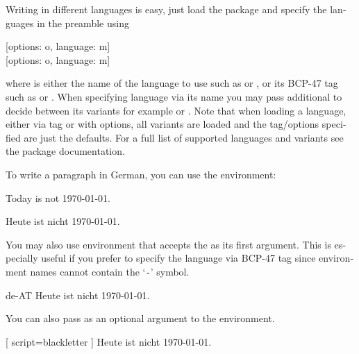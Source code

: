 Writing in different languages is easy, just load the  package
and specify the languages in the preamble using
\begin{lscommand}
  [options: o, language: m] \\
  [options: o, language: m]
\end{lscommand}
where  is either the name of the language to use such as
 or , or its BCP-47 tag such as  or
. When specifying language via its name you may pass
additional  to decide between its variants for example
 or . Note that when loading a
language, either via tag or with options, all variants are loaded and the
tag\slash{}options specified are just the defaults. For a full list of supported
languages and variants see the  package documentation.

To write a paragraph in German, you can use the  environment:

\begin{example}
\setdefaultlanguage{english}
Today is not \today.

\begin{german}
  Heute ist nicht \today.
\end{german}
\end{example}

You may also use  environment that accepts the  as its
first argument. This is especially useful if you prefer to specify the language
via BCP-47 tag since environment names cannot contain the
\enquote*{\texttt{-}} symbol.
\begin{example}
\begin{lang}{de-AT}
  Heute ist nicht \today.
\end{lang}
\end{example}

You can also pass  as an optional argument to the environment.
\begin{example}
\begin{german}[
  script=blackletter
]
  Heute ist nicht \today.
\end{german}
\end{example}

